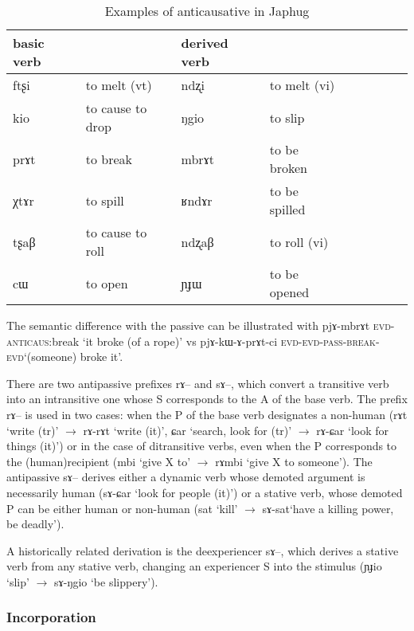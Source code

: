\documentclass[oldfontcommands,oneside,a4paper,11pt]{article}
\newcommand{\ipa}[1]{{\phon #1}} %
\begin{document}
\begin{table}[H]
\caption{Examples of anticausative in Japhug}\label{tab:anticausative}
\begin{tabular}{lllllllll} \toprule
basic verb  & &derived  verb &\\
\midrule
\ipa{ftʂi}  &	to melt (vt)	&		\ipa{ndʐi}  &	to melt (vi)		\\
\ipa{kio}  &	to cause to drop	&		\ipa{ŋgio}  &	to slip		\\
\ipa{prɤt}  &	to break	&		\ipa{mbrɤt}  &		to be broken	\\
\ipa{χtɤr}  &	 to spill	&		\ipa{ʁndɤr}  &		to be spilled	\\
\ipa{tʂaβ}  &	to cause to roll	&		\ipa{ndʐaβ}  &	to roll (vi)		\\
   \ipa{cɯ}  &	 to open 	&		\ipa{ɲɟɯ}  &	 to be opened	 	\\ 
 \bottomrule
\end{tabular}
\end{table}

The semantic difference with the passive can be illustrated with \ipa{pjɤ-mbrɤt} \textsc{evd-anticaus}:break `it broke (of a rope)' vs \ipa{pjɤ-kɯ-ɤ-prɤt-ci} \textsc{evd-evd-pass-break}-\textsc{evd}`(someone) broke it'.

There are two antipassive prefixes \ipa{rɤ--} and \ipa{sɤ--}, which convert a transitive verb into an intransitive one whose S corresponds to the A of the base verb. The prefix \ipa{rɤ--} is used in two cases: when the P of the base verb designates a non-human (\ipa{rɤt} `write (tr)' $\rightarrow$ \ipa{rɤ-rɤt} `write (it)', \ipa{ɕar} `search, look for (tr)' $\rightarrow$ \ipa{rɤ-ɕar} `look for things (it)') or in the case of ditransitive verbs, even when the P corresponds to the (human)recipient (\ipa{mbi} `give X to' $\rightarrow$ \ipa{rɤmbi} `give X to someone'). The antipassive \ipa{sɤ--} derives either a dynamic verb whose demoted argument is necessarily human (\ipa{sɤ-ɕar} `look for people (it)') or a stative verb, whose demoted P can be either human or non-human (\ipa{sat} `kill' $\rightarrow$ \ipa{sɤ-sat}`have a killing power, be deadly'). 

A historically related derivation is the deexperiencer \ipa{sɤ--}, which derives a stative verb from any stative verb, changing an experiencer S into the stimulus (\ipa{ɲɟio} `slip' $\rightarrow$ \ipa{sɤ-ŋgio} `be slippery').

\subsubsection{Incorporation}
\end{document}
